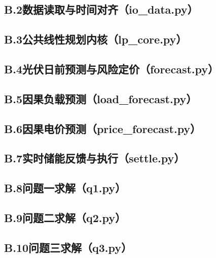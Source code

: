 \subsection*{B.2\quad 数据读取与时间对齐（io\_data.py）}


\subsection*{B.3\quad 公共线性规划内核（lp\_core.py）}


\subsection*{B.4\quad 光伏日前预测与风险定价（forecast.py）}


\subsection*{B.5\quad 因果负载预测（load\_forecast.py）}


\subsection*{B.6\quad 因果电价预测（price\_forecast.py）}


\subsection*{B.7\quad 实时储能反馈与执行（settle.py）}


\subsection*{B.8\quad 问题一求解（q1.py）}


\subsection*{B.9\quad 问题二求解（q2.py）}


\subsection*{B.10\quad 问题三求解（q3.py）}


